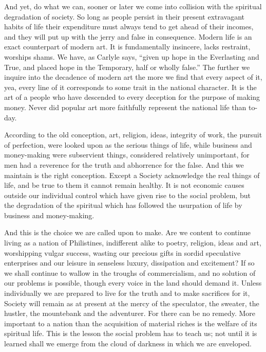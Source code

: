 \documentclass{book}
\begin{document}
And yet, do what we can, sooner or later we come into collision with the spiritual degradation of society. So long as people persist in their present extravagant habits of life their expenditure must always tend to get ahead of their incomes, and they will put up with the jerry and false in consequence. Modern life is an exact counterpart of modern art. It is fundamentally insincere, lacks restraint, worships shams. We have, as Carlyle says, “given up hope in the Everlasting and True, and placed hope in the Temporary, half or wholly false.” The further we inquire into the decadence of modern art the more we find that every aspect of it, yea, every line of it corresponds to some trait in the national character. It is the art of a people who have descended to every deception for the purpose of making money. Never did popular art more faithfully represent the national life than to-day.

According to the old conception, art, religion, ideas, integrity of work, the pursuit of perfection, were looked upon as the serious things of life, while business and money-making were subservient things, considered relatively unimportant, for men had a reverence for the truth and abhorrence for the false. And this we maintain is the right conception. Except a Society acknowledge the real things of life, and be true to them it cannot remain healthy. It is not economic causes outside our individual control which have given rise to the social problem, but the degradation of the spiritual which has followed the usurpation of life by business and money-making.

And this is the choice we are called upon to make. Are we content to continue living as a nation of Philistines, indifferent alike to poetry, religion, ideas and art, worshipping vulgar success, wasting our precious gifts in sordid speculative enterprises and our leisure in senseless luxury, dissipation and excitement? If so we shall continue to wallow in the troughs of commercialism, and no solution of our problems is possible, though every voice in the land should demand it. Unless individually we are prepared to live for the truth and to make sacrifices for it, Society will remain as at present at the mercy of the speculator, the sweater, the hustler, the mountebank and the adventurer. For there can be no remedy. More important to a nation than the acquisition of material riches is the welfare of its spiritual life. This is the lesson the social problem has to teach us; not until it is learned shall we emerge from the cloud of darkness in which we are enveloped.

\end{document}
